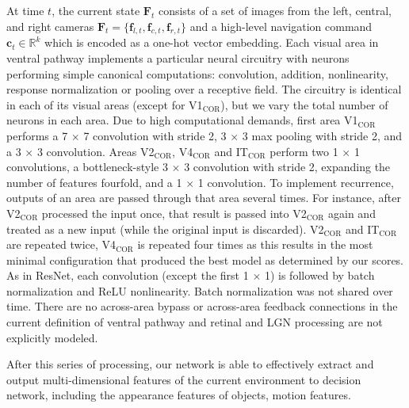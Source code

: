 At time $t$, the current state $\mathbf{F}_t$ consists of a set of images from the left, central, and right cameras $\mathbf{F}_{t}=\{\mathbf{f}_{l,t}, \mathbf{f}_{c,t}, \mathbf{f}_{r,t} \}$ and a high-level navigation command $\mathbf{c}_t\in\mathbb{R}^{k}$ which is encoded as a one-hot vector embedding.
%
Each visual area in ventral pathway implements a particular neural circuitry with neurons performing simple canonical computations: convolution, addition, nonlinearity, response normalization or pooling over a receptive field. 
The circuitry is identical in each of its visual areas (except for V1$_\text{COR}$), but we vary the total number of neurons in each area.
Due to high computational demands, first area V1$_\text{COR}$ performs a 7 $ \times $ 7 convolution with stride 2, 3 $ \times $ 3 max pooling with stride 2, and a 3 $ \times $ 3 convolution. 
Areas V2$_\text{COR}$, V4$_\text{COR}$ and IT$_\text{COR}$ perform two 1 $ \times $ 1 convolutions, a bottleneck-style 3 $ \times $ 3 convolution with stride 2, expanding the number of features fourfold, and a 1 $ \times $ 1 convolution. 
To implement recurrence, outputs of an area are passed through that area several times. 
For instance, after V2$_\text{COR}$ processed the input once, that result is passed into V2$_\text{COR}$ again and treated as a new input (while the original input is discarded). 
V2$_\text{COR}$ and IT$_\text{COR}$ are repeated twice, V4$_\text{COR}$ is repeated four times as this results in the most minimal configuration that produced the best model as determined by our scores. 
As in ResNet, each convolution (except the first 1 $ \times $ 1) is followed by batch normalization\cite{ioffe2015batch} and ReLU nonlinearity. 
Batch normalization was not shared over time\cite{ebski2018residual}. 
There are no across-area bypass or across-area feedback connections in the current definition of ventral pathway and retinal and LGN processing are not explicitly modeled.

%
After this series of processing, our network is able to effectively extract and output multi-dimensional features of the current environment to decision network, including the appearance features of objects, motion features.


